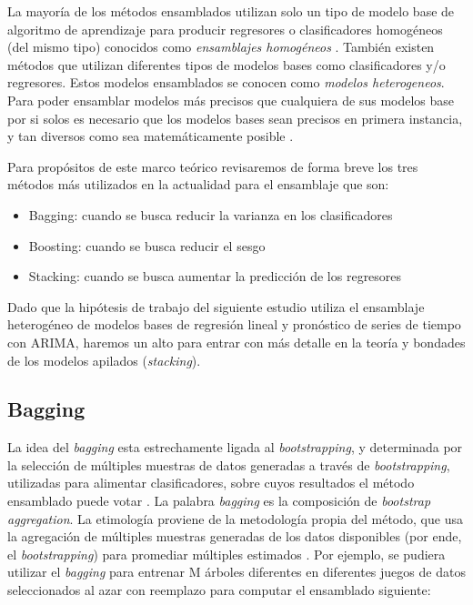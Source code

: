 La mayoría de los métodos ensamblados utilizan solo un tipo de modelo base de algoritmo de aprendizaje para producir regresores o clasificadores homogéneos (del mismo tipo) conocidos como \textit{ensamblajes homogéneos} \cite{smolyakov}. También existen métodos que utilizan diferentes tipos de modelos bases como clasificadores y/o regresores. Estos modelos ensamblados se conocen como \textit{modelos heterogeneos}. Para poder ensamblar modelos más precisos que cualquiera de sus modelos base por si solos es necesario que los modelos bases sean precisos en primera instancia, y tan diversos como sea matemáticamente posible \cite{smolyakov}.

Para propósitos de este marco teórico revisaremos de forma breve los tres métodos más utilizados en la actualidad para el ensamblaje que son:
\begin{itemize}
  \item Bagging: cuando se busca reducir la varianza en los clasificadores
  \item Boosting: cuando se busca reducir el sesgo
  \item Stacking: cuando se busca aumentar la predicción de los regresores
\end{itemize}

Dado que la hipótesis de trabajo del siguiente estudio utiliza el ensamblaje heterogéneo de modelos bases de regresión lineal y pronóstico de series de tiempo con ARIMA, haremos un alto para entrar con más detalle en la teoría y bondades de los modelos apilados (\emph{stacking}).

\subsection{Bagging}
La idea del \emph{bagging} esta estrechamente ligada al \emph{bootstrapping}, y determinada por la selección de múltiples muestras de datos generadas a través de \emph{bootstrapping}, utilizadas para alimentar clasificadores, sobre cuyos resultados el método ensamblado puede votar \cite{daume}. La palabra \emph{bagging} es la composición de \emph{bootstrap aggregation}. La etimología proviene de la metodología propia del método, que usa la agregación de múltiples muestras generadas de los datos disponibles (por ende, el \emph{bootstrapping}) para promediar múltiples estimados \cite{smolyakov}.
Por ejemplo, se pudiera utilizar el \emph{bagging} para entrenar M árboles diferentes en diferentes juegos de datos seleccionados al azar con reemplazo para computar el ensamblado siguiente:

